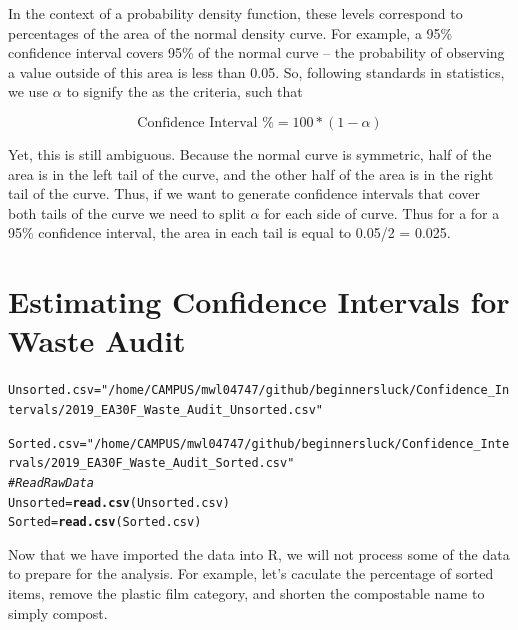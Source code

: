 \documentclass{tufte-handout}\usepackage[]{graphicx}\usepackage[]{color}
\makeatletter
\newcommand{\hlstr}[1]{\textcolor[rgb]{0.192,0.494,0.8}{#1}}%
\newcommand{\hlcom}[1]{\textcolor[rgb]{0.678,0.584,0.686}{\textit{#1}}}%
\newcommand{\hlstd}[1]{\textcolor[rgb]{0.345,0.345,0.345}{#1}}%
\newcommand{\hlkwb}[1]{\textcolor[rgb]{0.69,0.353,0.396}{#1}}%
\newcommand{\hlkwd}[1]{\textcolor[rgb]{0.737,0.353,0.396}{\textbf{#1}}}%
\newenvironment{kframe}{%
 \def\at@end@of@kframe{}%
 \ifinner\ifhmode%
  \def\at@end@of@kframe{\end{minipage}}%
  \begin{minipage}{\columnwidth}%
 \fi\fi%
 \def\FrameCommand##1{\hskip\@totalleftmargin \hskip-\fboxsep
 \colorbox{shadecolor}{##1}\hskip-\fboxsep
     \hskip-\linewidth \hskip-\@totalleftmargin \hskip\columnwidth}%
 \MakeFramed {\advance\hsize-\width
   \@totalleftmargin\z@ \linewidth\hsize
   \@setminipage}}%
 {\par\unskip\endMakeFramed%
 \at@end@of@kframe}
\newenvironment{knitrout}{}{} %
\makeatother
\begin{document}
In the context of a probability density function, these levels correspond to percentages of the area of the normal density curve. For example, a 95\% confidence interval covers 95\% of the normal curve -- the probability of observing a value outside of this area is less than 0.05. So, following standards in statistics, we use $\alpha$ to signify the as the criteria, such that

\begin{equation}
\textrm{Confidence Interval \% } = 100 * (1-\alpha)
\end{equation}

Yet, this is still ambiguous. Because the normal curve is symmetric, half of the area is in the left tail of the curve, and the other half of the area is in the right tail of the curve. Thus, if we want to generate confidence intervals that cover both tails of the curve we need to split $\alpha$ for each side of curve. Thus for a for a 95\% confidence interval, the area in each tail is equal to 0.05/2 = 0.025. 

\section{Estimating Confidence Intervals for Waste Audit}

\begin{knitrout}
\color{fgcolor}\begin{kframe}
\begin{alltt}
\hlstd{Unsorted.csv} \hlkwb{=} \hlstr{"/home/CAMPUS/mwl04747/github/beginnersluck/Confidence_Intervals/2019_EA30F_Waste_Audit_Unsorted.csv"}

\hlstd{Sorted.csv} \hlkwb{=} \hlstr{"/home/CAMPUS/mwl04747/github/beginnersluck/Confidence_Intervals/2019_EA30F_Waste_Audit_Sorted.csv"}
\hlcom{# Read Raw Data}
\hlstd{Unsorted} \hlkwb{=} \hlkwd{read.csv}\hlstd{(Unsorted.csv)}
\hlstd{Sorted} \hlkwb{=} \hlkwd{read.csv}\hlstd{(Sorted.csv)}
\end{alltt}
\end{kframe}
\end{knitrout}

Now that we have imported the data into R, we will not process some of the data to prepare for the analysis. For example, let's caculate the percentage of sorted items, remove the plastic film category, and shorten the compostable name to simply compost. 
\end{document}
